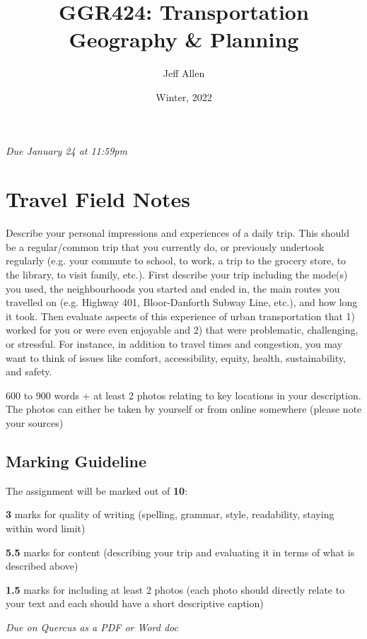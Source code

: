 \documentclass[11pt]{article}
\title{\textbf{GGR424: Transportation Geography \& Planning}}
\author{Jeff Allen}
\date{Winter, 2022}
\begin{document}
	\allsectionsfont{\sffamily}
		
	\textit{Due January 24 at 11:59pm}
		
	\section*{Travel Field Notes}
	
	Describe your personal impressions and experiences of a daily trip. This should be a regular/common trip that you currently do, or previously undertook regularly (e.g. your commute to school, to work, a trip to the grocery store, to the library, to visit family, etc.). First describe your trip including the mode(s) you used, the neighbourhoods you started and ended in, the main routes you travelled on (e.g. Highway 401, Bloor-Danforth Subway Line, etc.), and how long it took.
	Then evaluate aspects of this experience of urban transportation that 1) worked for you or were even enjoyable and 2) that were problematic, challenging, or stressful. For instance, in addition to travel times and congestion, you may want to think of issues like comfort, accessibility, equity, health, sustainability, and safety.	
	
	600 to 900 words + at least 2 photos relating to key locations in your description. The photos can either be taken by yourself or from online somewhere (please note your sources)

	
	\subsection*{Marking Guideline}
	
	The assignment will be marked out of \textbf{10}:
	
	\textbf{3} marks for quality of writing (spelling, grammar, style, readability, staying within word limit)
	
	\textbf{5.5} marks for content (describing your trip and evaluating it in terms of what is described above)
	
	\textbf{1.5} marks for including at least 2 photos (each photo should directly relate to your text and each should have a short descriptive caption)
	
	\textit{Due on Quercus as a PDF or Word doc}
	
\end{document}
